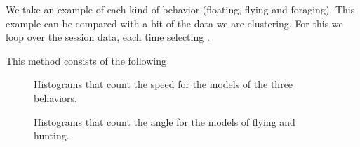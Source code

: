 We take an example of each kind of behavior (floating, flying and foraging).
This example can be compared with a bit of the data we are
clustering. For this we loop over the session data, each time selecting
\windowSize.

This method consists of the following 


\begin{figure}
  \centering
  \caption{Histograms that count the speed for the models of the three behaviors.}
  \label{fig:modelHistogramsSpeed}
\end{figure}


\begin{figure}
  \centering
  \caption{Histograms that count the angle for the models of flying and hunting.}
  \label{fig:modelHistogramsAngle}
\end{figure}


